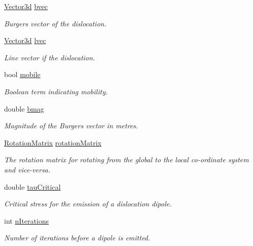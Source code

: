 \begin{DoxyCompactItemize}
\item 
\hyperlink{classVector3d}{Vector3d} \hyperlink{classDislocationSource_ade4753ac6106317c693c2bba4f83a568}{bvec}
\begin{DoxyCompactList}\small\item\em Burgers vector of the dislocation. \end{DoxyCompactList}\item 
\hyperlink{classVector3d}{Vector3d} \hyperlink{classDislocationSource_a6a1ab6dc549236d2335a200e601781ea}{lvec}
\begin{DoxyCompactList}\small\item\em Line vector if the dislocation. \end{DoxyCompactList}\item 
bool \hyperlink{classDislocationSource_a7cfb4fd64ac4da8c79398b6e2c732875}{mobile}
\begin{DoxyCompactList}\small\item\em Boolean term indicating mobility. \end{DoxyCompactList}\item 
double \hyperlink{classDislocationSource_a59c95f3cb5af5180d2c42792413f7816}{bmag}
\begin{DoxyCompactList}\small\item\em Magnitude of the Burgers vector in metres. \end{DoxyCompactList}\item 
\hyperlink{classRotationMatrix}{Rotation\-Matrix} \hyperlink{classDislocationSource_a3bb826a0646d5c5546045cbf8d523b4f}{rotation\-Matrix}
\begin{DoxyCompactList}\small\item\em The rotation matrix for rotating from the global to the local co-\/ordinate system and vice-\/versa. \end{DoxyCompactList}\item 
double \hyperlink{classDislocationSource_ad91294a3ab5b6f6156a2ad67b9df954e}{tau\-Critical}
\begin{DoxyCompactList}\small\item\em Critical stress for the emission of a dislocation dipole. \end{DoxyCompactList}\item 
int \hyperlink{classDislocationSource_aacf42c7505f28b50280b23b435024e17}{n\-Iterations}
\begin{DoxyCompactList}\small\item\em Number of iterations before a dipole is emitted. \end{DoxyCompactList}\item 

\end{DoxyCompactItemize}
